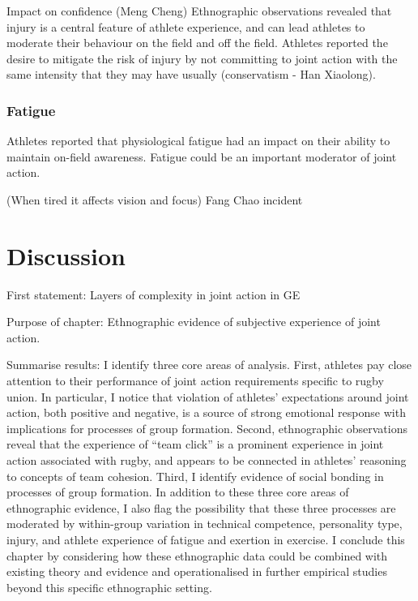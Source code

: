 \begin{CJK}{UTF8}{gbsn}
Impact on confidence (Meng Cheng)
Ethnographic observations revealed that injury is a central feature of athlete experience, and can lead athletes to moderate their behaviour on the field and off the field.  Athletes reported the desire to mitigate the risk of injury by not committing to joint action with the same intensity that they may have usually (conservatism - Han Xiaolong).


        \subsubsection{Fatigue}

Athletes reported that physiological fatigue had an impact on their ability to maintain on-field awareness.  Fatigue could be an important moderator of joint action.

(When tired it affects vision and focus)
Fang Chao incident








\section{Discussion}

First statement:
  Layers of complexity in joint action in GE

Purpose of chapter:
  Ethnographic evidence of subjective experience of joint action.




Summarise results:
 I identify three core areas of analysis.  First, athletes pay close attention to their performance of joint action requirements specific to rugby union.  In particular, I notice that violation of athletes' expectations around joint action, both positive and negative, is a source of strong emotional response with implications for processes of group formation.  Second, ethnographic observations reveal that the experience of ``team click'' is a prominent experience in joint action associated with rugby, and appears to be connected in athletes' reasoning to concepts of team cohesion.  Third, I identify evidence of social bonding in processes of group formation.  In addition to these three core areas of ethnographic evidence, I also flag the possibility that these three processes are moderated by within-group variation in technical competence, personality type, injury, and athlete experience of fatigue and exertion in exercise.  I conclude this chapter by considering how these ethnographic data could be combined with existing theory and evidence and operationalised in further empirical studies beyond this specific ethnographic setting.


\end{CJK}
